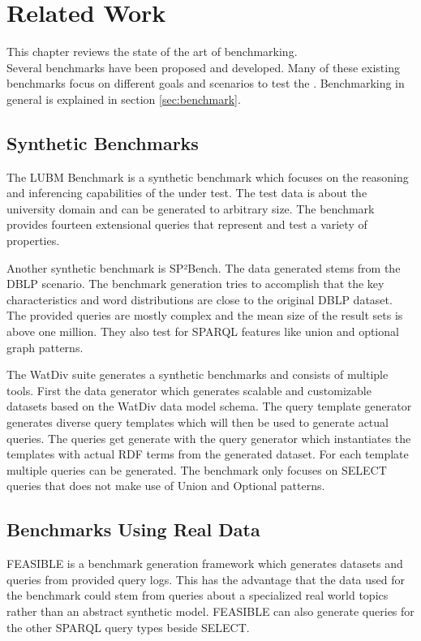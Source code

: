\chapter{Related Work}
\label{ch:related_work}

This chapter reviews the state of the art of \ts{} benchmarking.\\

Several benchmarks have been proposed and developed.
Many of these existing benchmarks focus on different goals and scenarios to test the \tsp{}.
Benchmarking in general is explained in section \ref{sec:benchmark}.

\section{Synthetic Benchmarks}
\label{sec:synthetic_benchmarks}
The LUBM Benchmark\cite{guoLUBMBenchmarkOWL2005} is a synthetic benchmark which focuses on the reasoning and inferencing capabilities of the \tsp{} under test.
The test data is about the university domain and can be generated to arbitrary size.
The benchmark provides fourteen extensional queries that represent and test a variety of properties.

Another synthetic benchmark is SP²Bench\cite{schmidtSP2BenchSPARQLPerformance2008}.
The data generated stems from the DBLP scenario. The benchmark generation tries to accomplish that the key characteristics and word distributions are close to the original DBLP dataset.
The provided queries are mostly complex and the mean size of the result sets is above one million\cite{saleemFEASIBLEFeatureBasedSPARQL2015}.
They also test for SPARQL features like union and optional graph patterns.

The WatDiv suite generates a synthetic benchmarks and consists of multiple tools\cite{alucDiversifiedStressTesting2014}.
First the data generator which generates scalable and customizable datasets based on the WatDiv data model schema.
The query template generator generates diverse query templates which will then be used to generate actual queries.
The queries get generate with the query generator which instantiates the templates with actual RDF terms from the generated dataset.
For each template multiple queries can be generated.
The benchmark only focuses on SELECT queries that does not make use of Union and Optional patterns.

\section{Benchmarks Using Real Data}
\label{sec:benchmarks_real_data}
FEASIBLE is a benchmark generation framework which generates datasets and queries from provided query logs\cite{saleemFEASIBLEFeatureBasedSPARQL2015}.
This has the advantage that the data used for the benchmark could stem from queries about a specialized real world topics rather than an abstract synthetic model.
FEASIBLE can also generate queries for the other SPARQL query types beside SELECT.

